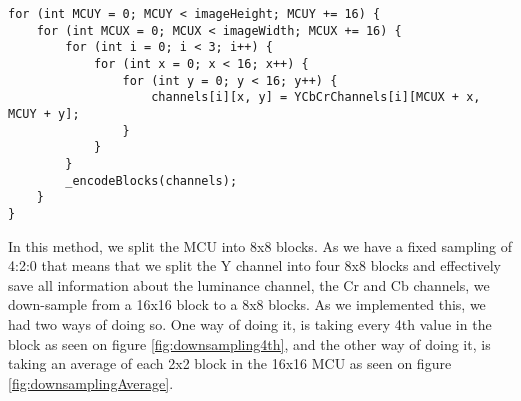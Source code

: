 \begin{lstlisting}[firstnumber=525, label=JPEGEncodeAndQuantize]
for (int MCUY = 0; MCUY < imageHeight; MCUY += 16) {
    for (int MCUX = 0; MCUX < imageWidth; MCUX += 16) {
        for (int i = 0; i < 3; i++) {
            for (int x = 0; x < 16; x++) {
                for (int y = 0; y < 16; y++) {
                    channels[i][x, y] = YCbCrChannels[i][MCUX + x, MCUY + y];
                }
            }
        }
        _encodeBlocks(channels);
    }
}
\end{lstlisting}

In this method, we split the MCU into 8x8 blocks.
As we have a fixed sampling of 4:2:0 that means that we split the Y channel into four 8x8 blocks and effectively save all information about the luminance channel, the Cr and Cb channels, we down-sample from a 16x16 block to a 8x8 blocks.
As we implemented this, we had two ways of doing so.
One way of doing it, is taking every 4th value in the block as seen on figure \ref{fig:downsampling4th}, and the other way of doing it, is taking an average of each 2x2 block in the 16x16 MCU as seen on figure \ref{fig:downsamplingAverage}.


